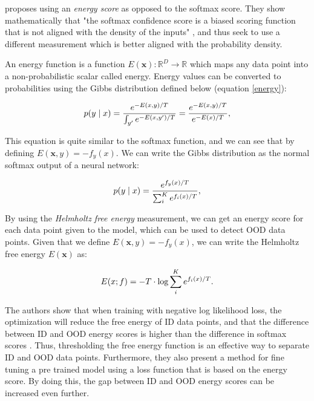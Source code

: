 \documentclass[UKenglish]{uiomasterthesis} %
\theoremstyle{definition}
\begin{document}
\cite{energy} proposes using an {\it energy score} as opposed to the softmax score. They show mathematically that "the softmax confidence score is a biased scoring function that is not aligned with the density of the inputs" \cite{energy}, and thus seek to use a different measurement which is better aligned with the probability density.

An energy function is a function $E(\bm{x}) : \mathbb{R}^D \rightarrow \mathbb{R}$ which maps any data point into a non-probabilistic scalar called energy. Energy values can be converted to probabilities using the Gibbs distribution defined below (equation \ref{energy}):

\begin{equation} \label{energy}
    p(y \mid \*x) = \frac{e^{-E(\*x,y)/T}}{\int_{y'} e^{-E(\*x, y')/T}}
    = \frac{e^{-E(\*x,y)/T}}{e^{-E(\*x)/T}},
\end{equation}

This equation is quite similar to the softmax function, and we can see that by defining $E(\bm{x}, y) = -f_y(x)$. We can write the Gibbs distribution as the normal softmax output of a neural network:

\begin{equation}\label{eq:softmax}
    p(y \mid \*x) = \frac{e^{f_y(\*x)/T}}{\sum_{i}^K e^{f_{i}(\*x)/T}},
\end{equation}

By using the {\it Helmholtz free energy} measurement, we can get an energy score for each data point given to the model, which can be used to detect OOD data points. Given that we define $E(\bm{x}, y) = -f_y(x)$, we can write the Helmholtz free energy $E(\bm{x})$ as:

\begin{equation}\label{eq:energy_softmax}
  E(\*x;f)=- T\cdot \text{log}\sum_i^K e^{f_i(\*x)/T}.
\end{equation}

The authors show that when training with negative log likelihood loss, the optimization will reduce the free energy of ID data points, and that the difference  between ID and OOD energy scores is higher than the difference in softmax scores \cite{energy}. Thus, thresholding the free energy function is an effective way to separate ID and OOD data points. Furthermore, they also present a method for fine tuning a pre trained model using a loss function that is based on the energy score. By doing this, the gap between ID and OOD energy scores can be increased even further.
\\
\end{document}

